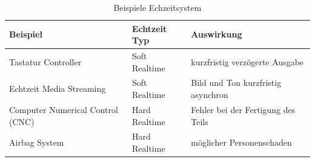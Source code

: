 \begin{table}
\centering
	\begin{tabular}{|l|l|l|}
		\hline
		\textbf{Beispiel} & \textbf{Echtzeit Typ}  & \textbf{Auswirkung} \\
		\hline
		Tastatur Controller & Soft Realtime & kurzfristig verzögerte Ausgabe \\
		\hline
		Echtzeit Media Streaming  & Soft Realtime & Bild und Ton kurzfristig asynchron \\
		\hline
		Computer Numerical Control (CNC)  & Hard Realtime & Fehler bei der Fertigung des Teils\\
		\hline
		Airbag System  & Hard Realtime & möglicher Personenschaden\\
		\hline
	\end{tabular}
	\caption{Beispiele Echzeitsystem}
	\label{tab:BeispieleEchzeitsystem}
\end{table}




